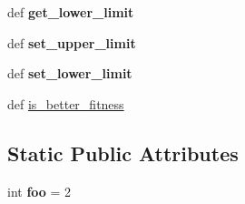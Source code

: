 \begin{DoxyCompactItemize}
\item 
\hypertarget{classsrc_1_1common__entities_1_1terrain_1_1Terrain_a4746c5022e4ae0a792e4fa68bce9845c}{
def {\bfseries get\_\-lower\_\-limit}}
\label{classsrc_1_1common__entities_1_1terrain_1_1Terrain_a4746c5022e4ae0a792e4fa68bce9845c}

\item 
\hypertarget{classsrc_1_1common__entities_1_1terrain_1_1Terrain_a624c6ddc62c760289e815699c8621a36}{
def {\bfseries set\_\-upper\_\-limit}}
\label{classsrc_1_1common__entities_1_1terrain_1_1Terrain_a624c6ddc62c760289e815699c8621a36}

\item 
\hypertarget{classsrc_1_1common__entities_1_1terrain_1_1Terrain_a3f9f494e7651fc9063299dc7277db191}{
def {\bfseries set\_\-lower\_\-limit}}
\label{classsrc_1_1common__entities_1_1terrain_1_1Terrain_a3f9f494e7651fc9063299dc7277db191}

\item 
def \hyperlink{classsrc_1_1common__entities_1_1terrain_1_1Terrain_a8002cbb6ca4a70d55e05968a2dbfd595}{is\_\-better\_\-fitness}
\end{DoxyCompactItemize}
\subsection*{Static Public Attributes}
\begin{DoxyCompactItemize}
\item 
\hypertarget{classsrc_1_1common__entities_1_1terrain_1_1Terrain_a59963644c583f161e7642f78494deac6}{
int {\bfseries foo} = 2}
\label{classsrc_1_1common__entities_1_1terrain_1_1Terrain_a59963644c583f161e7642f78494deac6}

\end{DoxyCompactItemize}
